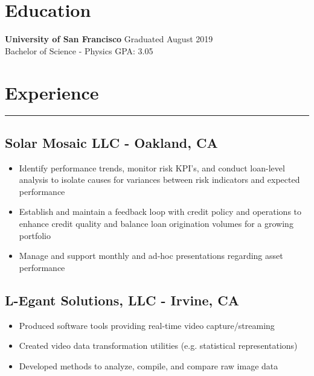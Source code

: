 \documentclass[11pt,a4paper]{article}
\newenvironment{myitemize}
{ \begin{itemize}[label={--}, leftmargin=*]
    \setlength{\itemsep}{0pt}
    \setlength{\parskip}{0pt}
    \setlength{\parsep}{0pt}     }
{ \end{itemize}                  }
\begin{document}
\section*{Education}
\vspace{-6.5mm} %
\noindent\makebox[\linewidth]{\rule{\textwidth}{0.4pt}}
\textbf{University of San Francisco} \hfill Graduated August 2019 \\
Bachelor of Science - Physics \hfill GPA: 3.05



\section*{Experience}
\vspace{-3mm} %
\hrule
\vspace{3mm} %

\subsection*{Solar Mosaic LLC - Oakland, CA \hfill {} }

\begin{myitemize}
\item Identify performance trends, monitor risk KPI’s, and conduct loan-level analysis to isolate causes for variances between risk indicators and expected performance
\item Establish and maintain a feedback loop with credit policy and operations to enhance credit quality and balance loan origination volumes for a growing portfolio
\item Manage and support monthly and ad-hoc presentations regarding asset performance
\end{myitemize}

\subsection*{L-Egant Solutions, LLC - Irvine, CA \hfill {} }

\begin{myitemize}
\item Produced software tools providing real-time video capture/streaming
\item Created video data transformation utilities (e.g. statistical representations)
\item Developed methods to analyze, compile, and compare raw image data 

\end{myitemize}
\end{document}
